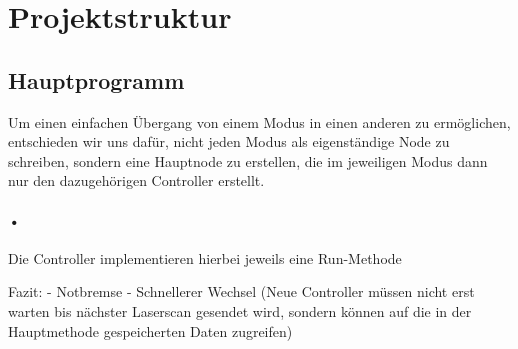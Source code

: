 \section{Projektstruktur}
\label{sec:projektstruktur}

\subsection{Hauptprogramm}
Um einen einfachen Übergang von einem Modus in einen anderen zu ermöglichen, entschieden wir uns dafür, nicht jeden Modus als eigenständige Node zu schreiben, sondern eine Hauptnode zu erstellen, die im jeweiligen Modus dann nur den dazugehörigen Controller erstellt.

\paragraph{•}
Die Controller implementieren hierbei jeweils eine Run-Methode

Fazit:
- Notbremse
- Schnellerer Wechsel (Neue Controller müssen nicht erst warten bis nächster Laserscan gesendet wird, sondern können auf die in der Hauptmethode gespeicherten Daten zugreifen)